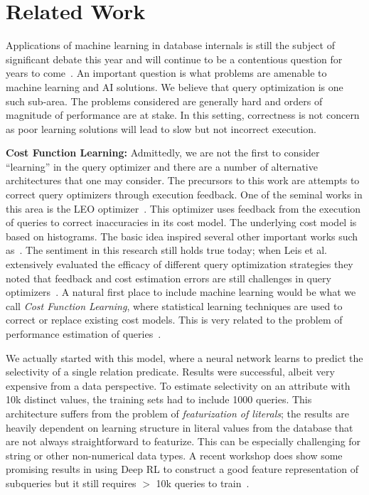 \section{Related Work}
Applications of machine learning in database internals is still the subject of significant debate this year and will continue to be a contentious question for years to come~\cite{btree, kraska2018case, mitzenmacher2018model, ma2018query}. An important question is what problems are amenable to machine learning and AI solutions. We believe that query optimization is one such sub-area. The problems considered are generally hard and orders of magnitude of performance are at stake. In this setting, correctness is not concern as poor learning solutions will lead to slow but not incorrect execution.

\vspace{0.5em}\noindent \textbf{Cost Function Learning: } 
Admittedly, we are not the first to consider ``learning'' in the query optimizer and there are a number of alternative architectures that one may consider. The precursors to this work are attempts to correct query optimizers through execution feedback.
One of the seminal works in this area is the LEO optimizer~\cite{markl2003leo}. This optimizer uses feedback from the execution of queries to correct inaccuracies in its cost model. The underlying cost model is based on histograms. The basic idea inspired several other important works such as~\cite{chaudhuri2008pay}. The sentiment in this research still holds true today; when Leis et al. extensively evaluated the efficacy of different query optimization strategies they noted that feedback and cost estimation errors are still challenges in query optimizers~\cite{leis2015good}. A natural first place to include machine learning would be what we call \emph{Cost Function Learning}, where statistical learning techniques are used to correct or replace existing cost models. This is very related to the problem of performance estimation of queries~\cite{akdere2012learning, wu2013predicting, wu2013towards}. 

We actually started with this model, where a neural network learns to predict the selectivity of a single relation predicate. Results were successful, albeit very expensive from a data perspective. To estimate selectivity on an attribute with 10k distinct values, the training sets had to include 1000 queries. This architecture suffers from the problem of \emph{featurization of literals}; the results are heavily dependent on learning structure in literal values from the database that are not always straightforward to featurize. This can be especially challenging for string or other non-numerical data types.  A recent workshop does show some promising results in using Deep RL to construct a good feature representation of subqueries but it still requires $>$ 10k queries to train~\cite{ortiz2018learning}. 

